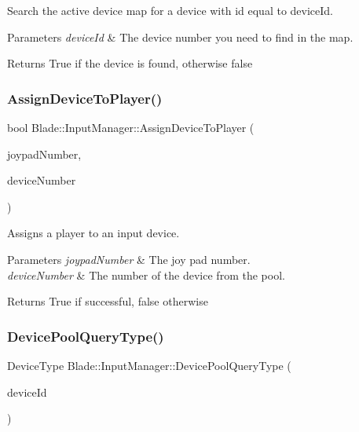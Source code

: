 Search the active device map for a device with id equal to device\+Id. 


\begin{DoxyParams}{Parameters}
{\em device\+Id} & The device number you need to find in the map. \\
\hline
\end{DoxyParams}
\begin{DoxyReturn}{Returns}
True if the device is found, otherwise false 
\end{DoxyReturn}
\mbox{\label{class_blade_1_1_input_manager_a5369c3110e39e5b3d01349ce7aa676ed}} 
\subsubsection{\texorpdfstring{Assign\+Device\+To\+Player()}{AssignDeviceToPlayer()}}
{\footnotesize\ttfamily bool Blade\+::\+Input\+Manager\+::\+Assign\+Device\+To\+Player (\begin{DoxyParamCaption}\item[{Joypad\+Number}]{joypad\+Number,  }\item[{int}]{device\+Number }\end{DoxyParamCaption})}



Assigns a player to an input device. 


\begin{DoxyParams}{Parameters}
{\em joypad\+Number} & The joy pad number. \\
\hline
{\em device\+Number} & The number of the device from the pool. \\
\hline
\end{DoxyParams}
\begin{DoxyReturn}{Returns}
True if successful, false otherwise 
\end{DoxyReturn}
\mbox{\label{class_blade_1_1_input_manager_a308a056833ddd9aa528ac4fbdbf9df4c}} 
\subsubsection{\texorpdfstring{Device\+Pool\+Query\+Type()}{DevicePoolQueryType()}}
{\footnotesize\ttfamily Device\+Type Blade\+::\+Input\+Manager\+::\+Device\+Pool\+Query\+Type (\begin{DoxyParamCaption}\item[{int}]{device\+Id }\end{DoxyParamCaption})}



